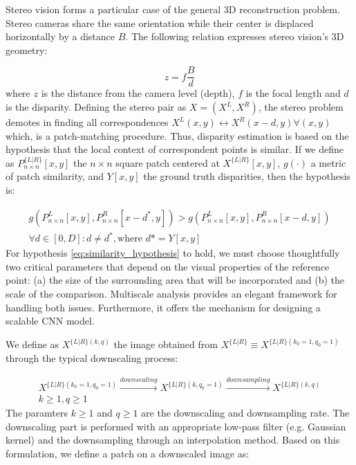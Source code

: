 \documentclass[runningheads]{llncs}
\begin{document}
Stereo vision forms a particular case of the general 3D reconstruction problem. Stereo cameras share the same orientation while their center is displaced horizontally by a distance $B$. The following relation expresses stereo vision's 3D geometry:

\begin{equation} \label{eq:stereo_geometry}
z = f\frac{B}{d}
\end{equation}
%
where $z$ is the distance from the camera level (depth), $f$ is the focal length and $d$ is the disparity. Defining the stereo pair as $X = (X^L, X^R)$, the stereo problem demotes in finding all correspondences $X^L(x,y) \leftrightarrow X^R(x-d, y) \forall (x,y)$ which, is a patch-matching procedure. Thus, disparity estimation is based on the hypothesis that the local context of correspondent points is similar. If we define as $P^{ \{L|R\} }_{n \times n}[x,y]$ the  $n \times n$ square patch centered at $X^{ \{L|R\} }[x,y]$, $g(\cdot)$ a metric of patch similarity, and $Y[x,y]$ the ground truth disparities, then the hypothesis is:

\begin{equation}
\begin{gathered} \label{eq:similarity_hypothesis}
    g(P^L_{n \times n}[x,y], P^R_{n \times n}[x-d^*,y]) > g(P^L_{n \times n}[x,y], P^R_{n \times n}[x-d,y]) \\
    \forall d \in [0,D] : d \neq d^*, \text{where $d* = Y[x,y]$}
\end{gathered}
\end{equation}
%
For hypothesis \ref{eq:similarity_hypothesis} to hold, we must choose thoughtfully two critical parameters that depend on the visual properties of the reference point: (a) the size of the surrounding area that will be incorporated and (b) the scale of the comparison. Multiscale analysis provides an elegant framework for handling both issues. Furthermore, it offers the mechanism for designing a scalable CNN model.

We define as $X^{ \{L|R\} (k,q)}$ the image obtained from $X^{ \{L|R\}} \equiv X^{ \{L|R\} (k_0=1,q_0=1)}$ through the typical downscaling process:

\begin{equation}
\begin{gathered} \label{eq:downsampling_procedure}
    X^{ \{L|R\} (k_0=1,q_0=1)} \xrightarrow{downscaling} 
    X^{ \{L|R\} (k,q_0=1)} \xrightarrow{downsampling} 
    X^{ \{L|R\} (k,q)}
    \\
    k\geq 1, q\geq 1 
\end{gathered}
\end{equation}
%
The paramters $k \geq 1$ and $q \geq 1$ are the downscaling and downsampling rate. The downscaling part is performed with an appropriate low-pass filter (e.g. Gaussian kernel) and the downsampling through an interpolation method. Based on this formulation, we define a patch on a downscaled image as:
\end{document}
